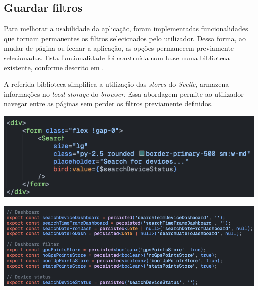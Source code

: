 \subsection{Guardar filtros}\label{sec:saveFilters} %
Para melhorar a usabilidade da aplicação, foram implementadas funcionalidades que tornam permanentes os filtros selecionados pelo utilizador. Dessa forma, ao mudar de página ou fechar a aplicação, as opções permanecem previamente selecionadas. Esta funcionalidade foi construída com base numa biblioteca existente, conforme descrito em  \cite{persisted-store.joshnuss.url}.

A referida biblioteca simplifica a utilização das \textit{stores} do \textit{Svelte}, armazena informações no \textit{local storage} do \textit{browser}. Essa abordagem permite ao utilizador navegar entre as páginas sem perder os filtros previamente definidos.


\begin{multicols}{2}
	\begin{center}
        \centering
        \includegraphics[width=0.9\columnwidth]{figs/store.svelte.png}
        \label{fig:store.svelte}
	\end{center}

\columnbreak

\begin{center}
		\centering
		\includegraphics[width=0.9\columnwidth]{figs/store.png}
		\label{fig:store}
\end{center}
\end{multicols}

